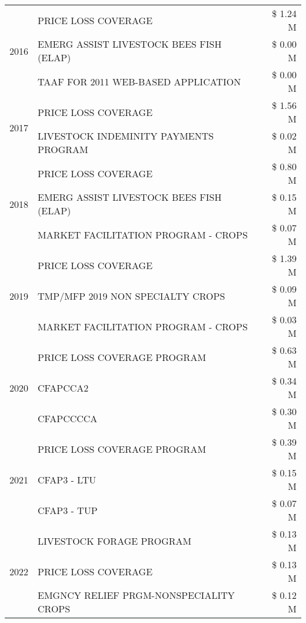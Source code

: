 \begin{tabular}{llr}
\cline{1-3}
\multirow[t]{3}{*}{2016} & PRICE LOSS COVERAGE & \$ 1.24 M \\
 & EMERG ASSIST LIVESTOCK BEES FISH (ELAP) & \$ 0.00 M \\
 & TAAF FOR 2011 WEB-BASED APPLICATION & \$ 0.00 M \\
\cline{1-3}
\multirow[t]{2}{*}{2017} & PRICE LOSS COVERAGE & \$ 1.56 M \\
 & LIVESTOCK INDEMINITY PAYMENTS PROGRAM & \$ 0.02 M \\
\cline{1-3}
\multirow[t]{3}{*}{2018} & PRICE LOSS COVERAGE & \$ 0.80 M \\
 & EMERG ASSIST LIVESTOCK BEES FISH (ELAP) & \$ 0.15 M \\
 & MARKET FACILITATION PROGRAM - CROPS & \$ 0.07 M \\
\cline{1-3}
\multirow[t]{3}{*}{2019} & PRICE LOSS COVERAGE & \$ 1.39 M \\
 & TMP/MFP 2019 NON SPECIALTY CROPS & \$ 0.09 M \\
 & MARKET FACILITATION PROGRAM - CROPS & \$ 0.03 M \\
\cline{1-3}
\multirow[t]{3}{*}{2020} & PRICE LOSS COVERAGE PROGRAM & \$ 0.63 M \\
 & CFAPCCA2 & \$ 0.34 M \\
 & CFAPCCCCA & \$ 0.30 M \\
\cline{1-3}
\multirow[t]{3}{*}{2021} & PRICE LOSS COVERAGE PROGRAM & \$ 0.39 M \\
 & CFAP3 - LTU & \$ 0.15 M \\
 & CFAP3 - TUP & \$ 0.07 M \\
\cline{1-3}
\multirow[t]{3}{*}{2022} & LIVESTOCK FORAGE PROGRAM & \$ 0.13 M \\
 & PRICE LOSS COVERAGE & \$ 0.13 M \\
 & EMGNCY RELIEF PRGM-NONSPECIALITY CROPS & \$ 0.12 M \\
\cline{1-3}
\bottomrule
\end{tabular}

